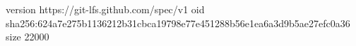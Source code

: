 version https://git-lfs.github.com/spec/v1
oid sha256:624a7e275b1136212b31cbca19798e77e451288b56e1ea6a3d9b5ae27efc0a36
size 22000

